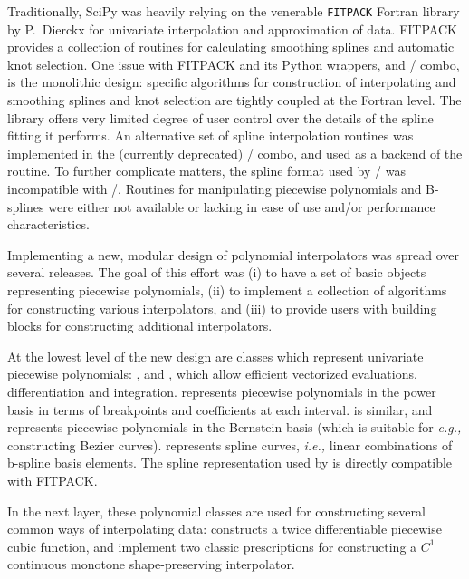 
Traditionally, SciPy was heavily relying on the venerable \texttt{FITPACK} Fortran library by P.~Dierckx \cite{Dierckx:1993:CSF:151103, FITPACK} for univariate interpolation and approximation of data. FITPACK provides a collection of routines for calculating smoothing splines and automatic knot selection. One issue with FITPACK and its Python wrappers,  and / combo, is the monolithic design: specific algorithms for construction of interpolating and smoothing splines and knot selection are tightly coupled at the Fortran level. The library offers very limited degree of user control over the details of the spline fitting it performs. 
%
An alternative set of spline interpolation routines was implemented in the (currently deprecated) / combo, and used as a backend of the  routine. To further complicate matters, the spline format used by / was incompatible with /.
%
Routines for manipulating piecewise polynomials and B-splines were either not available or lacking in ease of use and/or performance characteristics.

Implementing a new, modular design of polynomial interpolators was spread over several releases. The goal of this effort was (i) to have a set of basic objects representing piecewise polynomials, (ii) to implement a collection of algorithms for constructing various interpolators, and (iii) to provide users with building blocks for constructing additional interpolators.

At the lowest level of the new design are classes which represent univariate piecewise polynomials: ,  and , which allow efficient vectorized evaluations, differentiation and integration.
 represents piecewise polynomials in the power basis in terms of breakpoints and coefficients at each interval.  is similar, and  represents piecewise polynomials in the Bernstein basis (which is suitable for \textit{e.g.,} constructing Bezier curves).  represents spline curves, \textit{i.e.,} linear combinations of b-spline basis elements.
\cite{deBoor1978} 
The spline representation used by  is directly compatible with FITPACK.

In the next layer, these polynomial classes are used for constructing several common ways of interpolating data:  constructs a twice differentiable piecewise cubic function,  and  implement two classic prescriptions for constructing a $C^1$ continuous monotone shape-preserving interpolator. \cite{FritschCarlson1980, Akima1970}


